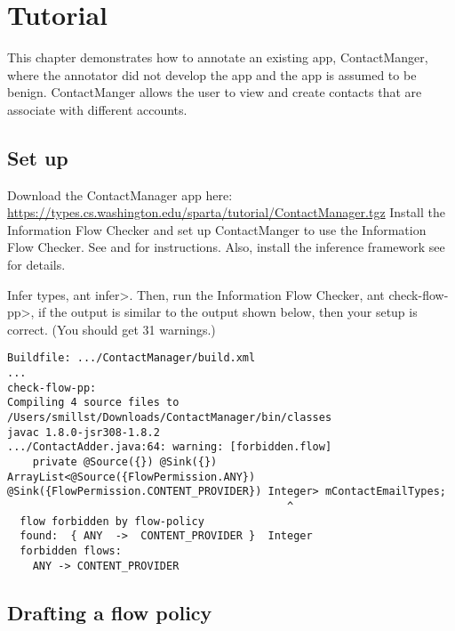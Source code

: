 \htmlhr


\newcommand{\method}[1]{\paragraph{#1}}
\newcommand{\annomethod}[1]{\small{\texttt{#1}}\newline}
\chapter{Tutorial\label{tutorial}}

This chapter demonstrates how to annotate an existing app, ContactManger,
 where the annotator did not develop the app and the app is assumed to be benign.
   ContactManger allows the user to view and create contacts that are associate 
   with different accounts.  


\section{Set up}
Download the ContactManager app here: \url{https://types.cs.washington.edu/sparta/tutorial/ContactManager.tgz}
Install the Information Flow Checker and set up ContactManger to use the Information Flow Checker. 
See   and  for instructions. Also, install the inference framework
see \secref{} for details.

Infer types, \<ant infer>.
Then, run the Information Flow Checker, \<ant check-flow-pp>, if the output is similar to 
the output shown below, then your setup is correct.  (You should get 31 warnings.)

\begin{Verbatim}
Buildfile: .../ContactManager/build.xml
...
check-flow-pp:
Compiling 4 source files to /Users/smillst/Downloads/ContactManager/bin/classes
javac 1.8.0-jsr308-1.8.2
.../ContactAdder.java:64: warning: [forbidden.flow]
    private @Source({}) @Sink({}) ArrayList<@Source({FlowPermission.ANY}) @Sink({FlowPermission.CONTENT_PROVIDER}) Integer> mContactEmailTypes;
                                            ^
  flow forbidden by flow-policy
  found:  { ANY  ->  CONTENT_PROVIDER }  Integer
  forbidden flows:
    ANY -> CONTENT_PROVIDER
\end{Verbatim} 

\section{Drafting a flow policy}

